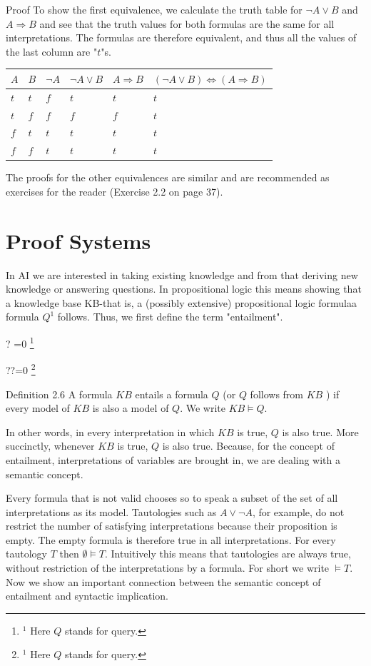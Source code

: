 \documentclass[10pt]{book}
\let\svthefootnote\thefootnote
\newcommand\blfootnotetext[1]{%
  \let\thefootnote\relax\footnote{#1}%
  \addtocounter{footnote}{-1}%
  \let\thefootnote\svthefootnote%
}
\let\svfootnotetext\footnotetext
\renewcommand\footnotetext[2][?]{%
  \if\relax#1\relax%
    \ifnum\value{footnote}=0\blfootnotetext{#2}\else\svfootnotetext{#2}\fi%
  \else%
    \if?#1\ifnum\value{footnote}=0\blfootnotetext{#2}\else\svfootnotetext{#2}\fi%
    \else\svfootnotetext[#1]{#2}\fi%
  \fi
}
\begin{document}
Proof To show the first equivalence, we calculate the truth table for $\neg A \vee B$ and $A \Rightarrow B$ and see that the truth values for both formulas are the same for all interpretations. The formulas are therefore equivalent, and thus all the values of the last column are "$t$"s.

\begin{center}
\begin{tabular}{llllll}
\hline
$A$ & $B$ & $\neg A$ & $\neg A \vee B$ & $A \Rightarrow B$ & $(\neg A \vee B) \Leftrightarrow(A \Rightarrow B)$ \\
\hline
$t$ & $t$ & $f$ & $t$ & $t$ & $t$ \\
\hline
$t$ & $f$ & $f$ & $f$ & $f$ & $t$ \\
\hline
$f$ & $t$ & $t$ & $t$ & $t$ & $t$ \\
\hline
$f$ & $f$ & $t$ & $t$ & $t$ & $t$ \\
\hline
\end{tabular}
\end{center}

The proofs for the other equivalences are similar and are recommended as exercises for the reader (Exercise 2.2 on page 37).

\section{Proof Systems}
In AI we are interested in taking existing knowledge and from that deriving new knowledge or answering questions. In propositional logic this means showing that a knowledge base KB-that is, a (possibly extensive) propositional logic formulaa formula $Q^{1}$ follows. Thus, we first define the term "entailment".

Definition 2.6 A formula $K B$ entails a formula $Q$ (or $Q$ follows from $K B$ ) if every model of $K B$ is also a model of $Q$. We write $K B \models Q$.

In other words, in every interpretation in which $K B$ is true, $Q$ is also true. More succinctly, whenever $K B$ is true, $Q$ is also true. Because, for the concept of entailment, interpretations of variables are brought in, we are dealing with a semantic concept.

Every formula that is not valid chooses so to speak a subset of the set of all interpretations as its model. Tautologies such as $A \vee \neg A$, for example, do not restrict the number of satisfying interpretations because their proposition is empty. The empty formula is therefore true in all interpretations. For every tautology $T$ then $\emptyset \models T$. Intuitively this means that tautologies are always true, without restriction of the interpretations by a formula. For short we write $\models T$. Now we show an important connection between the semantic concept of entailment and syntactic implication.
\end{document}
